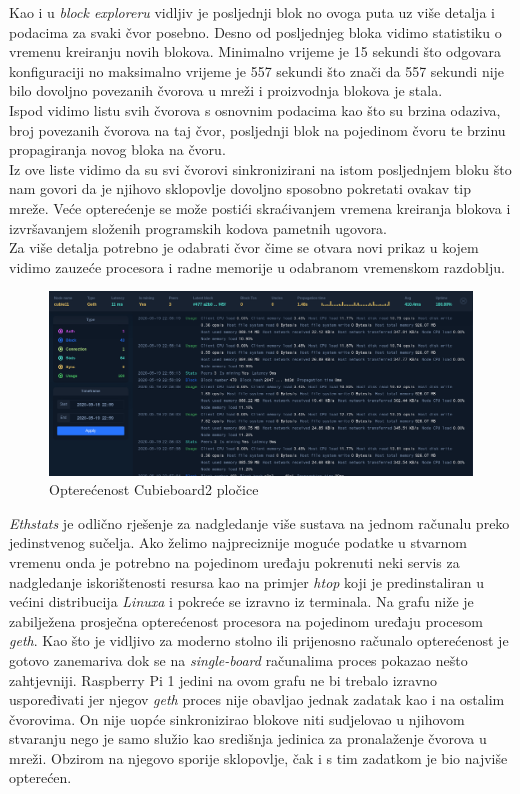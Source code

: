 \documentclass[times, utf8, zavrsni]{fer}
\begin{document}
Kao i u \emph{block exploreru} vidljiv je posljednji blok no ovoga puta uz više detalja i podacima za svaki čvor posebno.
Desno od posljednjeg bloka vidimo statistiku o vremenu kreiranju novih blokova. Minimalno vrijeme je 15 sekundi što odgovara konfiguraciji
no maksimalno vrijeme je 557 sekundi što znači da 557 sekundi nije bilo dovoljno povezanih čvorova u mreži i proizvodnja blokova je stala. \\
Ispod vidimo listu svih čvorova s osnovnim podacima kao što su brzina odaziva, broj povezanih čvorova na taj čvor, posljednji blok na pojedinom
čvoru te brzinu propagiranja novog bloka na čvoru. \\
Iz ove liste vidimo da su svi čvorovi sinkronizirani na istom posljednjem bloku što nam govori da je njihovo sklopovlje dovoljno sposobno
pokretati ovakav tip mreže. Veće opterećenje se može postići skraćivanjem vremena kreiranja blokova i izvršavanjem složenih programskih
kodova pametnih ugovora. \\
Za više detalja potrebno je odabrati čvor čime se otvara novi prikaz u kojem vidimo zauzeće procesora i radne memorije u odabranom
vremenskom razdoblju.
\pagebreak

\begin{figure}[ht]
  \includegraphics[width=\textwidth]{ethstatsCubie.png}
  \caption{Opterećenost Cubieboard2 pločice}
  \centering
\end{figure}

\emph{Ethstats} je odlično rješenje za nadgledanje više sustava na jednom računalu preko jedinstvenog sučelja. Ako želimo najpreciznije 
moguće podatke u stvarnom vremenu onda je potrebno na pojedinom uređaju pokrenuti neki servis za nadgledanje iskorištenosti resursa kao
na primjer \emph{htop} koji je predinstaliran u većini distribucija \emph{Linuxa} i pokreće se izravno iz terminala. Na grafu niže
je zabilježena prosječna opterećenost procesora na pojedinom uređaju procesom \emph{geth}. Kao što je vidljivo za moderno stolno ili prijenosno računalo opterećenost
je gotovo zanemariva dok se na \emph{single-board} računalima proces pokazao nešto zahtjevniji. Raspberry Pi 1 jedini na ovom grafu ne bi trebalo izravno uspoređivati
jer njegov \emph{geth} proces nije obavljao jednak zadatak kao i na ostalim čvorovima. On nije uopće sinkronizirao blokove niti sudjelovao u njihovom stvaranju nego
je samo služio kao središnja jedinica za pronalaženje čvorova u mreži. Obzirom na njegovo sporije sklopovlje, čak i s tim zadatkom je bio najviše opterećen.
\end{document}
